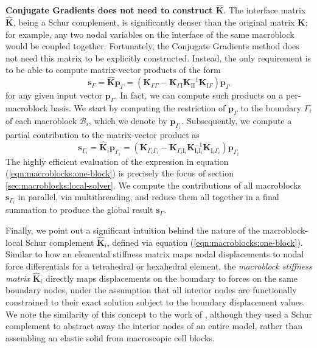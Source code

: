 \noindent\textbf{Conjugate Gradients does not need to construct $\hat{\mathbf{K}}$}. The interface matrix $\hat{\mathbf{K}}$, being a Schur complement, is significantly denser than
the original matrix $\mathbf{K}$; for example, any two nodal variables
on the interface of the same macroblock would be coupled
together. Fortunately, the Conjugate Gradients method does not need
this matrix to be explicitly constructed. Instead, the only
requirement is to be able to compute matrix-vector products of the
form
$$
\mathbf{s}_\Gamma=\hat{\mathbf{K}}\mathbf{p}_\Gamma=\left(\mathbf{K}_{\Gamma\Gamma}- \mathbf{K}_{\Gamma\mathrm{I}}\mathbf{K}_{\mathrm{I}\mathrm{I}}^{-1}\mathbf{K}_{\mathrm{I}\Gamma}\right)\mathbf{p}_\Gamma
$$
for any given input vector $\mathbf{p}_\Gamma$. In fact, we can compute such products on a per-macroblock basis. We start by computing the restriction of
$\mathbf{p}_\Gamma$ to the boundary $\Gamma_i$ of each macroblock $\mathcal{B}_i$, which we denote by $\mathbf{p}_{\Gamma_i}$. Subsequently, we compute a partial contribution to
the matrix-vector product as
\begin{equation}
\mathbf{s}_{\Gamma_i}=\hat{\mathbf{K}}_i\mathbf{p}_{\Gamma_i}=\left(\mathbf{K}_{\Gamma_i\Gamma_i}-
  \mathbf{K}_{\Gamma_i\mathrm{I}_i}\mathbf{K}_{\mathrm{I}_i\mathrm{I}_i}^{-1}\mathbf{K}_{\mathrm{I}_i\Gamma_i}\right)\mathbf{p}_{\Gamma_i}
\label{eqn:macroblocks:one-block}
\end{equation}
The highly efficient evaluation of the expression in equation
(\ref{eqn:macroblocks:one-block}) is precisely the focus of section
\ref{sec:macroblocks:local-solver}. We compute the contributions of all
macroblocks $\mathbf{s}_{\Gamma_i}$ in parallel, via multithreading,
and reduce them all together in a final summation to produce the
global result $\mathbf{s}_\Gamma$.

Finally, we point out a significant intuition behind the nature of the
macroblock-local Schur complement $\hat{\mathbf{K}}_i$, defined via
equation (\ref{eqn:macroblocks:one-block}). Similar to how an elemental stiffness
matrix maps nodal displacements to nodal force differentials for a
tetrahedral or hexahedral element, the \emph{macroblock stiffness
  matrix} $\hat{\mathbf{K}}_i$ directly maps displacements on the
boundary to forces on the same boundary nodes, under the assumption
that all interior nodes are functionally constrained to their exact
solution subject to the boundary displacement values. We note the
similarity of this concept to the work of \citet{GaoMS:2014},
although they used a Schur complement to abstract away the interior
nodes of an entire model, rather than assembling an elastic solid from
macroscopic cell blocks.


